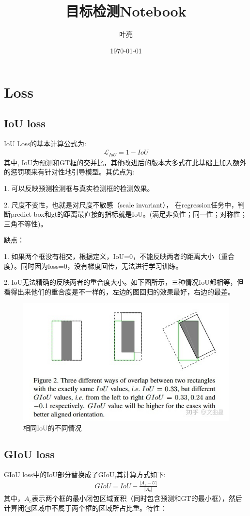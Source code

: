 \documentclass{article}
\title{目标检测Notebook}
\author{叶亮}
\date{\today}
\begin{document}
 
\maketitle
\section{Loss}
\subsection{IoU loss}
IoU Loss的基本计算公式为:
\begin{align}
\mathcal{L}_{IoU} = 1 - IoU
\end{align}
其中, IoU为预测和GT框的交并比，其他改进后的版本大多式在此基础上加入额外的惩罚项来有针对性地引导模型。其优点为:

1. 可以反映预测检测框与真实检测框的检测效果。

2. 尺度不变性，也就是对尺度不敏感（scale invariant）， 在regression任务中，判断predict box和gt的距离最直接的指标就是IoU。(满足非负性；同一性；对称性；三角不等性)。

缺点：

1. 如果两个框没有相交，根据定义，IoU=0，不能反映两者的距离大小（重合度）。同时因为loss=0，没有梯度回传，无法进行学习训练。

2. IoU无法精确的反映两者的重合度大小。如下图所示，三种情况IoU都相等，但看得出来他们的重合度是不一样的，左边的图回归的效果最好，右边的最差。
\begin{figure}[htp]
\centering
\includegraphics[scale=0.5]{images/IoU.jpg}
\caption{相同IoU的不同情况}
\label{Fig.IoU}
\end{figure}

\subsection{GIoU loss}
GIoU loss中的IoU部分替换成了GIoU,其计算方式如下:
\begin{align}
GIoU = IoU - \frac{\left| A_c - U \right|}{\left| A_c \right|}
\end{align}
其中，$A_c$表示两个框的最小闭包区域面积（同时包含预测和GT的最小框），然后计算闭包区域中不属于两个框的区域所占比重。特性：
\end{document}

